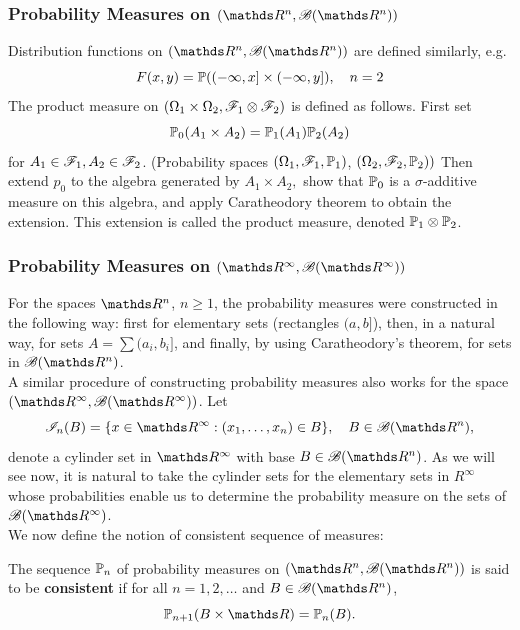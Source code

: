 \subsubsection{Probability Measures on $(\R^n, \B(\R^n))$}

Distribution functions on $(\R^n, \B(\R^n))$ are defined similarly, e.g.
\begin{equation*}
    F(x,y) = \mathbb{P}((-\infty, x] \times (-\infty, y]), \quad n=2
\end{equation*}
The product measure on $(\Omega_1 \times \Omega_2, \mathcal{F}_1 \otimes \mathcal{F}_2)$ is defined as follows. First set $$\mathbb{P}_0(A_1 \times A_2) = \mathbb{P}_1(A_1)\mathbb{P}_2(A_2)$$ for $A_1 \in \mathcal{F}_1, A_2 \in \mathcal{F}_2$. (Probability spaces $(\Omega_1, \mathcal{F}_1, \mathbb{P}_1)$, $(\Omega_2, \mathcal{F}_2, \mathbb{P}_2))$ Then extend $p_0$ to the algebra generated by $A_1 \times A_2,$ show that $\mathbb{P}_0$ is a $\sigma$-additive measure on this algebra, and apply Caratheodory theorem to obtain the extension. This extension is called the product measure, denoted $\mathbb{P}_1 \otimes \mathbb{P}_2$.\\

\subsubsection{Probability Measures on $(\R^\infty, \B(\R^\infty))$}
For the spaces $\R^n$, $n \ge 1$, the probability measures were constructed in the following way: first for elementary sets (rectangles $(a, b]$), then, in a natural way, for sets $A = \sum (a_i, b_i]$, and finally, by using Caratheodory’s theorem, for sets in $\B(\R^n)$.\\

A similar procedure of constructing probability measures also works for the space $(\R^\infty, \B(\R^\infty))$. Let
\begin{equation*}
    \mathcal{I}_n(B) = \{ x \in \R^\infty : (x_1, \dots, x_n) \in B\}, \quad B \in \B(\R^n),
\end{equation*}
denote a cylinder set in $\R^\infty$ with base $B \in \B(\R^n)$. As we will see now, it is natural to take the cylinder sets for the elementary sets in $R^\infty$ whose probabilities enable us to determine the probability measure on the sets of $\B(\R^\infty)$.\\

We now define the notion of consistent sequence of measures:

\begin{definition} \label{def:consistent_sequence}
The sequence $\mathbb{P}_n$ of probability measures on $(\R^n, \B(\R^n))$ is said to be \textbf{consistent} if for all $n = 1,2, \dots$ and $B \in \B(\R^n)$,
\begin{equation*}
    \p_{n+1}(B \times \R) = \p_n (B).
\end{equation*}
\end{definition}

